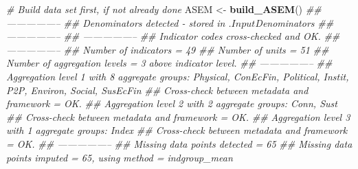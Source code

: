 \documentclass[
]{book}
\newenvironment{Shaded}{\begin{snugshade}}{\end{snugshade}}
\newcommand{\CommentTok}[1]{\textcolor[rgb]{0.56,0.35,0.01}{\textit{#1}}}
\newcommand{\KeywordTok}[1]{\textcolor[rgb]{0.13,0.29,0.53}{\textbf{#1}}}
\newcommand{\NormalTok}[1]{#1}
\newcommand{\StringTok}[1]{\textcolor[rgb]{0.31,0.60,0.02}{#1}}
\begin{document}
\begin{Shaded}
\begin{Highlighting}[]
\CommentTok{# Build data set first, if not already done}
\NormalTok{ASEM <-}\StringTok{ }\KeywordTok{build_ASEM}\NormalTok{()}
\CommentTok{## -----------------}
\CommentTok{## Denominators detected - stored in .$Input$Denominators}
\CommentTok{## -----------------}
\CommentTok{## -----------------}
\CommentTok{## Indicator codes cross-checked and OK.}
\CommentTok{## -----------------}
\CommentTok{## Number of indicators = 49}
\CommentTok{## Number of units = 51}
\CommentTok{## Number of aggregation levels = 3 above indicator level.}
\CommentTok{## -----------------}
\CommentTok{## Aggregation level 1 with 8 aggregate groups: Physical, ConEcFin, Political, Instit, P2P, Environ, Social, SusEcFin}
\CommentTok{## Cross-check between metadata and framework = OK.}
\CommentTok{## Aggregation level 2 with 2 aggregate groups: Conn, Sust}
\CommentTok{## Cross-check between metadata and framework = OK.}
\CommentTok{## Aggregation level 3 with 1 aggregate groups: Index}
\CommentTok{## Cross-check between metadata and framework = OK.}
\CommentTok{## -----------------}
\CommentTok{## Missing data points detected = 65}
\CommentTok{## Missing data points imputed = 65, using method = indgroup_mean}


\end{Highlighting}
\end{Shaded}
\end{document}
